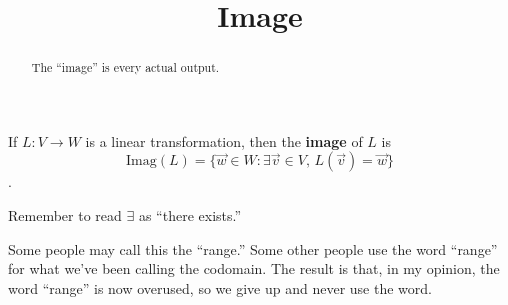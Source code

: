 \documentclass{ximera}
\title{Image}
\begin{document}
\begin{abstract}
  The ``image'' is every actual output.
\end{abstract}\maketitle

\begin{definition}
  If $L:V \to W$ is a linear transformation, then the \textbf{image}
  of $L$ is $$\text{Imag}(L) = \{\vec{w} \in W: \exists \vec{v} \in V,\, L(\vec{v}) = \vec{w}\}$$.
\end{definition}

Remember to read $\exists$ as ``there exists.''

\begin{warning}
  Some people may call this the ``range.''  Some other people use the
  word ``range'' for what we've been calling the codomain.  The result
  is that, in my opinion, the word ``range'' is now overused, so we
  give up and never use the word.
\end{warning}
\end{document}

